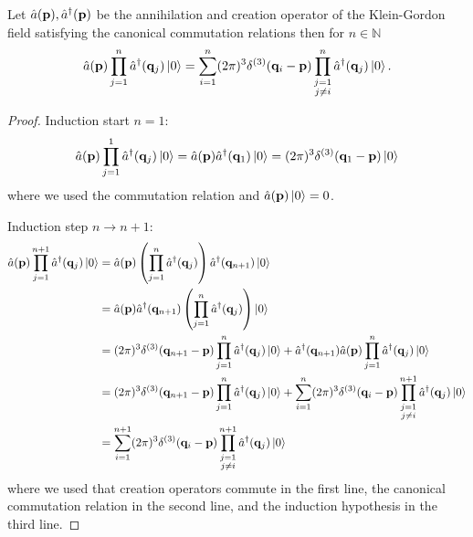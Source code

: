 \begin{lemma}\label{th:normal_ordered_a1_cn}
	Let $\hat{a}(\vb{p}),\hat{a}^\dagger(\vb{p})$ be the annihilation and creation operator of the Klein-Gordon field satisfying the canonical commutation relations then for $n\in\mathbb{N}$
	\begin{equation}
		\hat{a}(\vb{p})
		\prod_{j=1}^n
		\hat{a}^\dagger(\vb{q}_j)
		\ket{0}
		=
		\sum_{i=1}^n
		(2\pi)^3
		\delta^{(3)}(\vb{q}_i-\vb{p})
		\prod_{\substack{j=1\\j\neq i}}^n
		\hat{a}^\dagger(\vb{q}_j)
		\ket{0}
		\label{eq:normal_ordered_a1_cn}
		.
	\end{equation}
\end{lemma}
\begin{proof}
	Induction start $n=1$:
	\begin{equation*}
		\hat{a}(\vb{p})
		\prod_{j=1}^1
		\hat{a}^\dagger(\vb{q}_j)
		\ket{0}
		=
		\hat{a}(\vb{p})
		\hat{a}^\dagger(\vb{q}_1)
		\ket{0}
		=
		(2\pi)^3
		\delta^{(3)}(\vb{q}_1-\vb{p})
		\ket{0}
	\end{equation*}
	where we used the commutation relation and $\hat{a}(\vb{p})\ket{0}=0$.

	Induction step $n\to n+1$:
	\begin{equation*}
		\begin{split}
			\hat{a}(\vb{p})
			\prod_{j=1}^{n+1}
			\hat{a}^\dagger(\vb{q}_j)
			\ket{0}
			&=
			\hat{a}(\vb{p})
			\left(
				\prod_{j=1}^n
				\hat{a}^\dagger(\vb{q}_j)
			\right)
			\hat{a}^\dagger(\vb{q}_{n+1})
			\ket{0}
			\\
			&=
			\hat{a}(\vb{p})
			\hat{a}^\dagger(\vb{q}_{n+1})
			\left(
				\prod_{j=1}^n
				\hat{a}^\dagger(\vb{q}_j)
			\right)
			\ket{0}
			\\
			&=
			(2\pi)^3
			\delta^{(3)}(\vb{q}_{n+1}-\vb{p})
			\prod_{j=1}^n
			\hat{a}^\dagger(\vb{q}_j)
			\ket{0}
			+
			\hat{a}^\dagger(\vb{q}_{n+1})
			\hat{a}(\vb{p})
			\prod_{j=1}^n
			\hat{a}^\dagger(\vb{q}_j)
			\ket{0}
			\\
			&=
			(2\pi)^3
			\delta^{(3)}(\vb{q}_{n+1}-\vb{p})
			\prod_{j=1}^n
			\hat{a}^\dagger(\vb{q}_j)
			\ket{0}
			+
			\sum_{i=1}^n
			(2\pi)^3
			\delta^{(3)}(\vb{q}_i-\vb{p})
			\prod_{\substack{j=1\\j\neq i}}^{n+1}
			\hat{a}^\dagger(\vb{q}_j)
			\ket{0}
			\\
			&=
			\sum_{i=1}^{n+1}
			(2\pi)^3
			\delta^{(3)}(\vb{q}_i-\vb{p})
			\prod_{\substack{j=1\\j\neq i}}^{n+1}
			\hat{a}^\dagger(\vb{q}_j)
			\ket{0}
		\end{split}
	\end{equation*}
	where we used that creation operators commute in the first line, the canonical commutation relation in the second line, and the induction hypothesis in the third line.
\end{proof}
